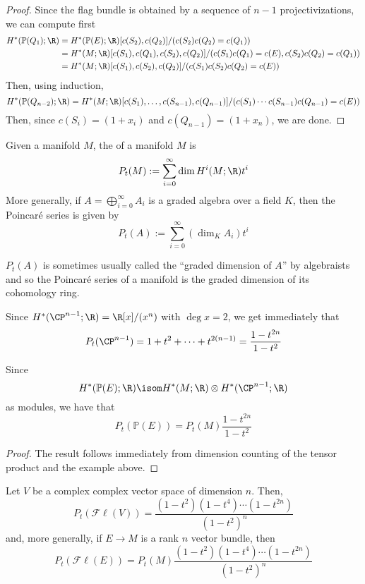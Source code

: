 \documentclass[11pt,leqno,oneside]{amsbook}
\renewcommand{\P}{\mathbb{P}}
\numberwithin{thm}{section}
\newcommand{\Fl}{\mathcal{F\ell}}
\begin{document}
\begin{proof}
  Since the flag bundle is obtained by a sequence of \(n-1\)
  projectivizations, we can compute first
  \begin{align*}
    H^*(\P(Q_1);\R)
    & = H^*(\P(E);\R)[c(S_2), c(Q_2)]/(c(S_2) c(Q_2) = c(Q_1)) \\
    & = H^*(M;\R)[c(S_1), c(Q_1), c(S_2), c(Q_2)]/(c(S_1) c(Q_1) =
      c(E), c(S_2) c(Q_2) = c(Q_1)) \\
    & = H^*(M;\R)[c(S_1), c(S_2), c(Q_2)]/(c(S_1) c(S_2) c(Q_2) = c(E))
  \end{align*}
  Then, using induction, \[
    H^*(\P(Q_{n-2});\R) = H^*(M;\R)[c(S_1), \ldots, c(S_{n-1}),
    c(Q_{n-1})]/(c(S_1) \cdots c(S_{n-1})c(Q_{n-1}) = c(E))
  \]
  Then, since \(c(S_i) = (1+x_i)\) and \(c(Q_{n-1}) = (1+x_n)\), we
  are done.
\end{proof}
\begin{defn}
  Given a manifold \(M\), the  of a manifold
  \(M\) is \[
    P_t(M) := \sum_{i=0}^\infty \dim H^i(M;\R) t^i
  \]
  More generally, if \(A = \bigoplus_{i=0}^\infty A_i\)  is a graded
  algebra over a field \(K\), then the Poincar\'{e} series is given
  by \[
    P_t(A) := \sum_{i=0}^\infty (\dim_K A_i) t^i
  \]
\end{defn}
\begin{rmk}
  \(P_t(A)\) is sometimes usually called the ``graded dimension of
  \(A\)'' by algebraists and so the Poincar\'{e} series of a manifold
  is the graded dimension of its cohomology ring.
\end{rmk}
\begin{example}
  Since \(H^*(\CP^{n-1};\R) = \R[x]/(x^n)\) with \(\deg x = 2\), we
  get immediately that \[
    P_t(\CP^{n-1}) = 1 + t^2 + \cdots + t^{2(n-1)} = \frac{1-t^{2n}}{1-t^2}
  \]  
\end{example}
\begin{lem}
  Since \[
    H^*(\P(E);\R) \isom H^*(M;\R) \otimes H^*(\CP^{n-1};\R)
  \]
  as modules, we have that \[
    P_t(\P(E)) = P_t(M) \frac{1-t^{2n}}{1-t^2}
  \]
\end{lem}
\begin{proof}
  The result follows immediately from dimension counting of the
  tensor product and the example above.
\end{proof}
\begin{cor}\label{poincare-of-flag-manifold}
  Let \(V\) be a complex complex vector space of dimension
  \(n\). Then, \[
    P_t(\Fl(V)) = \frac{(1-t^2)(1-t^4) \cdots (1-t^{2n})}{(1-t^2)^n}
  \]
  and, more generally, if \(E \to M\) is a rank \(n\) vector bundle,
  then \[
    P_t(\Fl(E)) = P_t(M) \frac{(1-t^2)(1-t^4) \cdots (1-t^{2n})}{(1-t^2)^n}
  \]
\end{cor}
\end{document}
